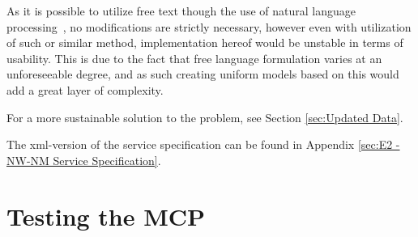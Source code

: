As it is possible to utilize free text though the use of natural language processing~\cite{nlp}, no modifications are strictly necessary, however even with utilization of such or similar method, implementation hereof would be unstable in terms of usability. This is due to the fact that free language formulation varies at an unforeseeable degree, and as such creating uniform models based on this would add a great layer of complexity.

For a more sustainable solution to the problem, see Section \ref{sec:Updated Data}.

The xml-version of the service specification can be found in Appendix \ref{sec:E2 - NW-NM Service Specification}.

\section{Testing the MCP}

